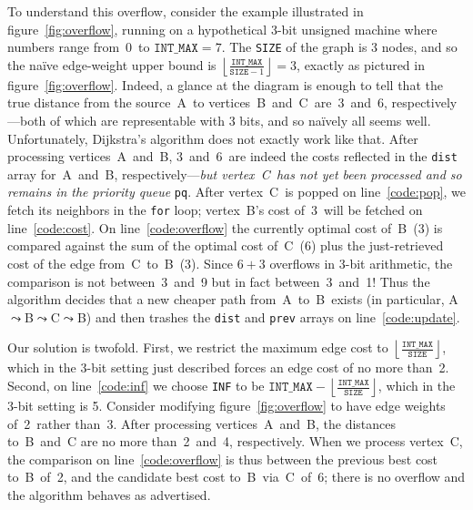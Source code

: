 To understand this overflow, consider the example illustrated in figure~\ref{fig:overflow}, running on a hypothetical 3-bit unsigned machine where numbers range from~0~to $\texttt{INT\_MAX}=7$.  The \texttt{SIZE} of the graph is 3 nodes, and so the na\"ive edge-weight upper bound is $\left\lfloor\frac{\texttt{INT\_MAX}}{\texttt{SIZE}-1}\right\rfloor = 3$, exactly as pictured in figure~\ref{fig:overflow}.  Indeed, a glance at the diagram is enough to tell that the true distance from the source~A~to vertices~B~and~C~are~3~and~6, respectively---both of which are representable with 3 bits, and so na\"ively all seems well.  Unfortunately, Dijkstra's algorithm does not exactly work like that.  After processing vertices~A~and~B, 3~and~6~are indeed the costs reflected in the \texttt{dist} array for~A~and~B, respectively---\emph{but vertex~C~has not yet been processed and so remains in the priority queue} \texttt{pq}.  After vertex~C~is popped on line~\ref{code:pop}, we fetch its neighbors in the \texttt{for} loop; vertex~B's cost of~3~will be fetched on line~\ref{code:cost}.  On line~\ref{code:overflow} the currently optimal cost of~B~(3) is compared against the sum of the optimal cost of~C~(6) plus the just-retrieved cost of the edge from~C~to~B~(3).  Since $6+3$ overflows in 3-bit arithmetic, the comparison is not between~3~and~9 but in fact between~3~and~1!  Thus the algorithm decides that a new cheaper path from~A~to~B~exists (in particular, A$\leadsto$B$\leadsto$C$\leadsto$B) and then trashes the \texttt{dist} and \texttt{prev} arrays on line~\ref{code:update}.

Our solution is twofold.  First, we restrict the maximum edge cost to $\left\lfloor\frac{\texttt{INT\_MAX}}{\texttt{SIZE}}\right\rfloor$, which in the 3-bit setting just described forces an edge cost of no more than~2.  Second, on line~\ref{code:inf} we choose \texttt{INF} to be $\texttt{INT\_MAX} - \left\lfloor \frac{\texttt{INT\_MAX}}{\texttt{SIZE}} \right\rfloor$, which in the 3-bit setting is 5.  Consider modifying figure~\ref{fig:overflow} to
have edge weights of~2~rather than~3.  After processing vertices~A~and~B, the distances to~B~and~C are no more than~2~and~4, respectively.  When we process vertex~C, the comparison on line~\ref{code:overflow} is thus between the previous best cost to~B~of~2, and the candidate best cost to~B~via~C~of~6; there is no overflow and the algorithm behaves as advertised.

